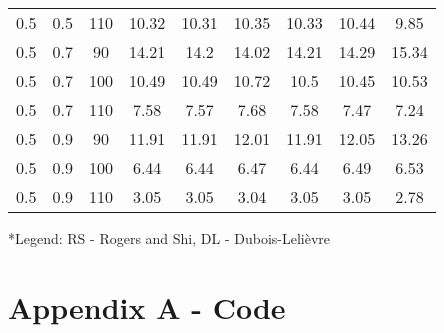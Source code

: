 \documentclass{article}
\begin{document}
\begin{table}[H]
\begin{tabular}{|c|c|c|c|c|c|c|c|c|}
  0.5 & 0.5 & 110 & 10.32 & 10.31 & 10.35 & 10.33 & 10.44 & 9.85 \\
  0.5 & 0.7 & 90 & 14.21 & 14.2 & 14.02 & 14.21 & 14.29 & 15.34 \\
  0.5 & 0.7 & 100 & 10.49 & 10.49 & 10.72 & 10.5 & 10.45 & 10.53 \\
  0.5 & 0.7 & 110 & 7.58 & 7.57 & 7.68 & 7.58 & 7.47 & 7.24 \\
  0.5 & 0.9 & 90 & 11.91 & 11.91 & 12.01 & 11.91 & 12.05 & 13.26 \\
  0.5 & 0.9 & 100 & 6.44 & 6.44 & 6.47 & 6.44 & 6.49 & 6.53 \\
  0.5 & 0.9 & 110 & 3.05 & 3.05 & 3.04 & 3.05 & 3.05 & 2.78 \\
  \hline
  \end{tabular}
\end{table}
\scriptsize
*Legend: RS - Rogers and Shi, DL - Dubois-Leli\`{e}vre
\normalsize

\section{Appendix A - Code}



\end{document}
